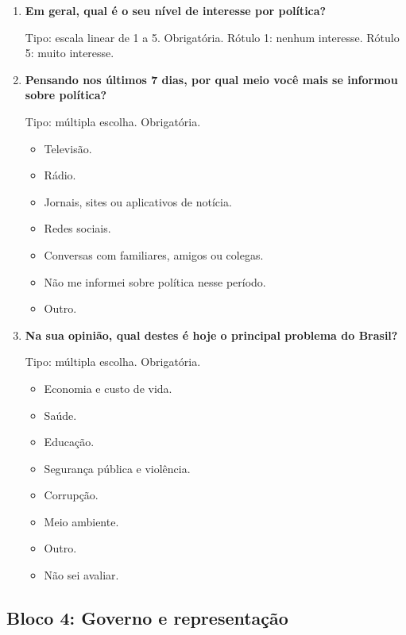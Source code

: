 \documentclass[11pt,a4paper]{article}
\begin{document}
\begin{enumerate}[resume]
\item \textbf{Em geral, qual é o seu nível de interesse por política?}

Tipo: escala linear de 1 a 5. Obrigatória. Rótulo 1: nenhum interesse. Rótulo 5: muito interesse.

\item \textbf{Pensando nos últimos 7 dias, por qual meio você mais se informou sobre política?}

Tipo: múltipla escolha. Obrigatória.
\begin{itemize}
\item Televisão.
\item Rádio.
\item Jornais, sites ou aplicativos de notícia.
\item Redes sociais.
\item Conversas com familiares, amigos ou colegas.
\item Não me informei sobre política nesse período.
\item Outro.
\end{itemize}

\item \textbf{Na sua opinião, qual destes é hoje o principal problema do Brasil?}

Tipo: múltipla escolha. Obrigatória.
\begin{itemize}
\item Economia e custo de vida.
\item Saúde.
\item Educação.
\item Segurança pública e violência.
\item Corrupção.
\item Meio ambiente.
\item Outro.
\item Não sei avaliar.
\end{itemize}
\end{enumerate}

\subsection*{Bloco 4: Governo e representação}
\end{document}
